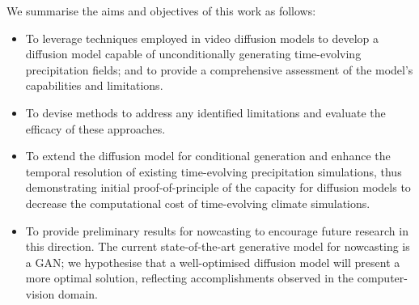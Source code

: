 \documentclass[ oneside,%
                    author={George Herbert},
                    degree={MSci},
                     title={Diffusion Models for Time-Evolving Precipitation Fields},
                  subtitle={}]{dissertation}
\begin{document}
We summarise the aims and objectives of this work as follows:
\begin{itemize}
      \item To leverage techniques employed in video diffusion models to develop a diffusion model capable of unconditionally generating time-evolving precipitation fields; and to provide a comprehensive assessment of the model's capabilities and limitations.
      \item To devise methods to address any identified limitations and evaluate the efficacy of these approaches.
      \item To extend the diffusion model for conditional generation and enhance the temporal resolution of existing time-evolving precipitation simulations, thus demonstrating initial proof-of-principle of the capacity for diffusion models to decrease the computational cost of time-evolving climate simulations.
      \item To provide preliminary results for nowcasting to encourage future research in this direction. The current state-of-the-art generative model for nowcasting \cite{Ravuri_Skillful_Precipitation_Nowcasting} is a GAN; we hypothesise that a well-optimised diffusion model will present a more optimal solution, reflecting accomplishments observed in the computer-vision domain.
\end{itemize}

\end{document}
